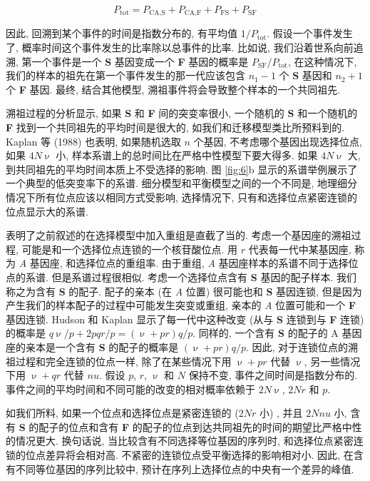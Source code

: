 \documentclass[12pt]{article}
\begin{document}
\begin{equation*}
    P_{\text{tot}} = P_{\text{CA},\text{S}} + P_{\text{CA},\text{F}} + P_{\text{FS}} + P_{\text{SF}}
\end{equation*}

因此, 回溯到某个事件的时间是指数分布的, 有平均值 $1/P_{\text{tot}}$. 假设一个事件发生了,
概率时间这个事件发生的比率除以总事件的比率. 比如说, 我们沿着世系向前追溯,
第一个事件是一个 \textbf{S} 基因变成一个 \textbf{F} 基因的概率是 $P_{\text{SF}}/P_{\text{tot}}$,
在这种情况下, 我们的样本的祖先在第一个事件发生的那一代应该包含 $n_{1}-1$ 个 \textbf{S} 基因和 $n_{2}+1$
个 \textbf{F} 基因. 最终, 结合其他模型, 溯祖事件将会导致整个样本的一个共同祖先.

溯祖过程的分析显示, 如果 \textbf{S} 和 \textbf{F} 间的突变率很小,
一个随机的 \textbf{S} 和一个随机的 \textbf{F} 找到一个共同祖先的平均时间是很大的, 如我们和迁移模型类比所预料到的. Kaplan
等 (1988) 也表明, 如果随机选取 $n$ 个基因, 不考虑哪个基因出现选择位点, 如果 $4N\upnu$ 小,
样本系谱上的总时间比在严格中性模型下要大得多. 如果 $4N\upnu$ 大, 到共同祖先的平均时间本质上不受选择的影响. 图 \ref{fig:6}b
显示的系谱举例展示了一个典型的低突变率下的系谱. 细分模型和平衡模型之间的一个不同是,
地理细分情况下所有位点应该以相同方式受影响, 选择情况下, 只有和选择位点紧密连锁的位点显示大的系谱.

\textcite{hudson1988} 表明了之前叙述的在选择模型中加入重组是直截了当的. 考虑一个基因座的溯祖过程,
可能是和一个选择位点连锁的一个核苷酸位点. 用 $r$ 代表每一代中某基因座, 称为 \textit{A} 基因座, 和选择位点的重组率.
由于重组, \textit{A} 基因座样本的系谱不同于选择位点的系谱. 但是系谱过程很相似.
考虑一个选择位点含有 \textbf{S} 基因的配子样本. 我们称之为含有 \textbf{S} 的配子. 配子的亲本 (在 \textit{A} 位置)
很可能也和 \textbf{S} 基因连锁, 但是因为产生我们的样本配子的过程中可能发生突变或重组,
亲本的 \textit{A} 位置可能和一个 \textbf{F} 基因连锁. Hudson 和 Kaplan 显示了每一代中这种改变
(从与 \textbf{S} 连锁到与 \textbf{F} 连锁) 的概率是 $q\upnu/p+2pqr/p=(\upnu+pr)q/p$. 同样的,
一个含有 \textbf{S} 的配子的 A 基因座的亲本是一个含有 \textbf{S} 的配子的概率是 $(\upnu+pr)q/p$. 因此,
对于连锁位点的溯祖过程和完全连锁的位点一样, 除了在某些情况下用 $\upnu+pr$ 代替 $\upnu$, 另一些情况下用 $\upnu+qr$ 代替 $nu
$. 假设 $p$, $r$, $\upnu$ 和 $N$ 保持不变, 事件之间时间是指数分布的. 事件之间的平均时间和不同可能的改变的相对概率依赖于
$2N\upnu$, $2Nr$ 和 $p$.

如我们所料, 如果一个位点和选择位点是紧密连锁的 ($2Nr$ 小) , 并且 $2Nnu$ 小,
含有 \textbf{S} 的配子的位点和含有 \textbf{F} 的配子的位点到达共同祖先的时间的期望比严格中性的情况更大. 换句话说,
当比较含有不同选择等位基因的序列时, 和选择位点紧密连锁的位点差异将会相对高. 不紧密的连锁位点受平衡选择的影响相对小. 因此,
在含有不同等位基因的序列比较中, 预计在序列上选择位点的中央有一个差异的峰值.
\end{document}
